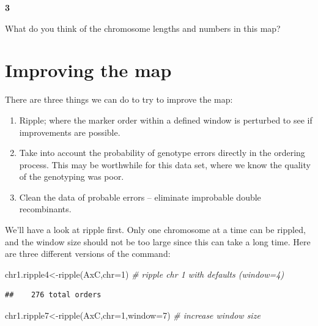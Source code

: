\documentclass[
]{book}
\makeatletter
\newenvironment{Shaded}{\begin{snugshade}}{\end{snugshade}}
\newcommand{\AttributeTok}[1]{\textcolor[rgb]{0.77,0.63,0.00}{#1}}
\newcommand{\CommentTok}[1]{\textcolor[rgb]{0.56,0.35,0.01}{\textit{#1}}}
\newcommand{\DecValTok}[1]{\textcolor[rgb]{0.00,0.00,0.81}{#1}}
\newcommand{\FunctionTok}[1]{\textcolor[rgb]{0.00,0.00,0.00}{#1}}
\newcommand{\NormalTok}[1]{#1}
\newcommand{\OtherTok}[1]{\textcolor[rgb]{0.56,0.35,0.01}{#1}}
\newenvironment{kframe}{%
\medskip{}
\setlength{\fboxsep}{.8em}
 \def\at@end@of@kframe{}%
 \ifinner\ifhmode%
  \def\at@end@of@kframe{\end{minipage}}%
  \begin{minipage}{\columnwidth}%
 \fi\fi%
 \def\FrameCommand##1{\hskip\@totalleftmargin \hskip-\fboxsep
 \colorbox{shadecolor}{##1}\hskip-\fboxsep
     \hskip-\linewidth \hskip-\@totalleftmargin \hskip\columnwidth}%
 \MakeFramed {\advance\hsize-\width
   \@totalleftmargin\z@ \linewidth\hsize
   \@setminipage}}%
 {\par\unskip\endMakeFramed%
 \at@end@of@kframe}
\newenvironment{rmdblock}[1]
  {
  \begin{itemize}
  \renewcommand{\labelitemi}{
    \raisebox{-.7\height}[0pt][0pt]{
      {\setkeys{Gin}{width=3em,keepaspectratio}\texttt{[image: images/\#1]}}
    }
  }
  \setlength{\fboxsep}{1em}
  \begin{kframe}
  \item
  }
  {
  \end{kframe}
  \end{itemize}
  }
\newenvironment{rmdquiz}
  {\begin{rmdblock}{quiz}}
  {\end{rmdblock}}
\makeatother
\begin{document}
\begin{rmdquiz}
\textbf{3}

What do you think of the chromosome lengths and numbers in this map?
\end{rmdquiz}

\hypertarget{improving-the-map}{%
\section{Improving the map}\label{improving-the-map}}

There are three things we can do to try to improve the map:

\begin{enumerate}
\def\labelenumi{\arabic{enumi}.}
\item
  Ripple; where the marker order within a defined window is perturbed to see if improvements are possible.
\item
  Take into account the probability of genotype errors directly in the ordering process. This may be worthwhile for this data set, where we know the quality of the genotyping was poor.
\item
  Clean the data of probable errors -- eliminate improbable double recombinants.
\end{enumerate}

We'll have a look at ripple first. Only one chromosome at a time can be rippled, and the window size should not be too large since this can take a long time. Here are three different versions of the command:

\begin{Shaded}
\begin{Highlighting}[]
\NormalTok{chr1.ripple4}\OtherTok{\textless{}{-}}\FunctionTok{ripple}\NormalTok{(AxC,}\AttributeTok{chr=}\DecValTok{1}\NormalTok{)     }\CommentTok{\# ripple chr 1 with defaults (window=4)}
\end{Highlighting}
\end{Shaded}

\begin{verbatim}
##    276 total orders
\end{verbatim}

\begin{Shaded}
\begin{Highlighting}[]
\NormalTok{chr1.ripple7}\OtherTok{\textless{}{-}}\FunctionTok{ripple}\NormalTok{(AxC,}\AttributeTok{chr=}\DecValTok{1}\NormalTok{,}\AttributeTok{window=}\DecValTok{7}\NormalTok{)    }\CommentTok{\# increase window size }
\end{Highlighting}
\end{Shaded}
\end{document}
